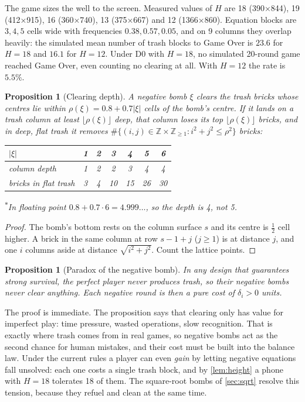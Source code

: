 \documentclass[11pt,a4paper]{article}
\newtheorem{proposition}[theorem]{Proposition}
\theoremstyle{definition}
\theoremstyle{remark}
\newcommand{\Z}{\mathbb{Z}}
\newcommand{\abs}[1]{\lvert #1\rvert}
\begin{document}
The game sizes the well to the screen. Measured values of $H$ are 18 (390×844),
19 (412×915), 16 (360×740), 13 (375×667) and 12 (1366×860). Equation blocks are
$3,4,5$ cells wide with frequencies $0.38,0.57,0.05$, and on 9 columns they overlap
heavily: the simulated mean number of trash blocks to Game Over is $23.6$ for $H=18$
and $16.1$ for $H=12$. Under D0 with $H=18$, no simulated 20-round game reached Game
Over, even counting no clearing at all. With $H=12$ the rate is $5.5\%$.

\begin{proposition}[Clearing depth]\label{prop:clear}
A negative bomb $\xi$ clears the trash bricks whose centres lie within
$\rho(\xi)=0.8+0.7\abs\xi$ cells of the bomb's centre. If it lands on a trash column at
least $\lfloor\rho(\xi)\rfloor$ deep, that column loses its top $\lfloor\rho(\xi)\rfloor$ bricks, and in deep,
flat trash it removes $\#\{(i,j)\in\Z\times\Z_{\ge1}:i^2+j^2\le\rho^2\}$ bricks:
\begin{center}\small
\begin{tabular}{lcccccc}\toprule
$\abs\xi$&1&2&3&4&5&6\\\midrule
column depth&1&2&2&3&4&4\rlap{\,\textsuperscript{$*$}}\\
bricks in flat trash&3&4&10&15&26&30\\\bottomrule
\end{tabular}
\end{center}
\textsuperscript{$*$}In floating point $0.8+0.7\cdot6=4.999\ldots$, so the depth is 4, not 5.
\end{proposition}
\begin{proof}
The bomb's bottom rests on the column surface $s$ and its centre is $\frac12$ cell
higher. A brick in the same column at row $s-1+j$ ($j\ge1$) is at distance $j$, and one
$i$ columns aside at distance $\sqrt{i^2+j^2}$. Count the lattice points.
\end{proof}

\begin{proposition}[Paradox of the negative bomb]\label{prop:paradox}
In any design that guarantees strong survival, the perfect player never produces trash,
so their negative bombs never clear anything. Each negative round is then a pure cost of
$\delta_i>0$ units.
\end{proposition}

The proof is immediate. The proposition says that clearing only has value for
imperfect play: time pressure, wasted operations, slow recognition. That is exactly
where trash comes from in real games, so negative bombs act as the second chance for
human mistakes, and their cost must be built into the balance law. Under the current
rules a player can even \emph{gain} by letting negative equations fall unsolved: each
one costs a single trash block, and by \cref{lem:height} a phone with $H=18$ tolerates
18 of them. The square-root bombs of \cref{sec:sqrt} resolve this tension, because they
refuel and clean at the same time.
\end{document}
